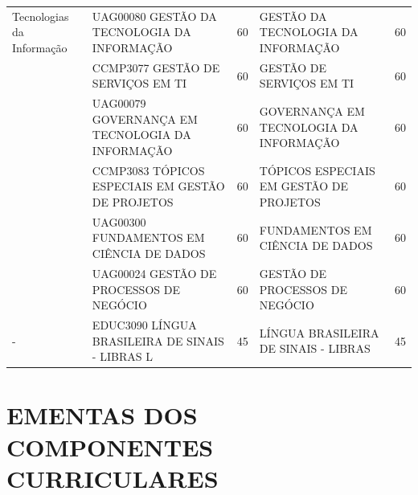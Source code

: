 \documentclass[
	12pt,				%
	openright,			%
  oneside,     %
	a4paper,			%
	chapter=TITLE,		%
	english,			%
	french,				%
	spanish,			%
	brazil				%
	]{abntex2}
\begin{document}
\begin{center}
\begin{tiny}
\begin{longtable}{p{2cm}p{5.4cm}cp{5.4cm}c}
    Tecnologias da Informação & UAG00080 GESTÃO DA TECNOLOGIA DA INFORMAÇÃO & 60 & GESTÃO DA TECNOLOGIA DA INFORMAÇÃO & 60 \\ \cline{2-5}
      & CCMP3077 GESTÃO DE SERVIÇOS EM TI & 60 & GESTÃO DE SERVIÇOS EM TI & 60 \\ \cline{2-5}
      & UAG00079 GOVERNANÇA EM TECNOLOGIA DA INFORMAÇÃO & 60 & GOVERNANÇA EM TECNOLOGIA DA INFORMAÇÃO & 60 \\ \cline{2-5}
      & CCMP3083 TÓPICOS ESPECIAIS EM GESTÃO DE PROJETOS & 60 & TÓPICOS ESPECIAIS EM GESTÃO DE PROJETOS & 60 \\ \cline{2-5}
      & UAG00300 FUNDAMENTOS EM CIÊNCIA DE DADOS & 60 & FUNDAMENTOS EM CIÊNCIA DE DADOS & 60 \\ \cline{2-5}
      & UAG00024 GESTÃO DE PROCESSOS DE NEGÓCIO & 60 & GESTÃO DE PROCESSOS DE NEGÓCIO & 60 \\ \midrule
    - & EDUC3090 LÍNGUA BRASILEIRA DE SINAIS - LIBRAS L & 45 & LÍNGUA BRASILEIRA DE SINAIS - LIBRAS & 45 \\ 
  \bottomrule
  \end{longtable}
  \end{tiny}
  \end{center}
  






%
%


\chapter{EMENTAS DOS COMPONENTES CURRICULARES}


\vspace*{9.5cm}
\end{document}
